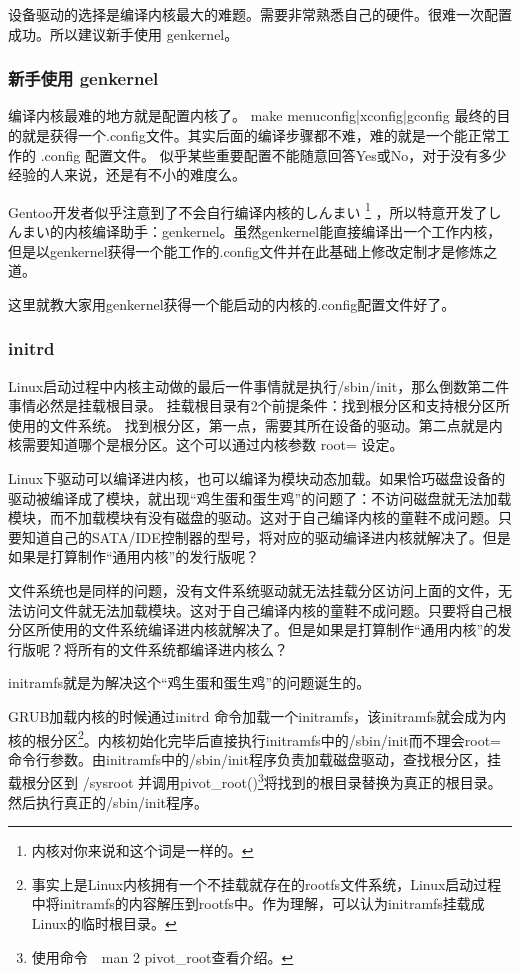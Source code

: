 设备驱动的选择是编译内核最大的难题。需要非常熟悉自己的硬件。很难一次配置成功。所以建议新手使用 genkernel。

\subsubsection{新手使用 genkernel}

编译内核最难的地方就是配置内核了。 make menuconfig|xconfig|gconfig 最终的目的就是获得一个.config文件。其实后面的编译步骤都不难，难的就是一个能正常工作的 .config 配置文件。
似乎某些重要配置不能随意回答Yes或No，对于没有多少经验的人来说，还是有不小的难度么。

Gentoo开发者似乎注意到了不会自行编译内核的しんまい%
\footnote{内核对你来说和这个词是一样的。}%
，所以特意开发了しんまい的内核编译助手：genkernel。虽然genkernel能直接编译出一个工作内核，
但是以genkernel获得一个能工作的.config文件并在此基础上修改定制才是修炼之道。

这里就教大家用genkernel获得一个能启动的内核的.config配置文件好了。

\subsubsection{initrd}\label{sec:initrd}

Linux启动过程中内核主动做的最后一件事情就是执行/sbin/init，那么倒数第二件事情必然是挂载根目录。
挂载根目录有2个前提条件：找到根分区和支持根分区所使用的文件系统。
找到根分区，第一点，需要其所在设备的驱动。第二点就是内核需要知道哪个是根分区。这个可以通过内核参数 root= 设定。

Linux下驱动可以编译进内核，也可以编译为模块动态加载。如果恰巧磁盘设备的驱动被编译成了模块，就出现“鸡生蛋和蛋生鸡”的问题了：不访问磁盘就无法加载模块，而不加载模块有没有磁盘的驱动。这对于自己编译内核的童鞋不成问题。只要知道自己的SATA/IDE控制器的型号，将对应的驱动编译进内核就解决了。但是如果是打算制作“通用内核”的发行版呢？

文件系统也是同样的问题，没有文件系统驱动就无法挂载分区访问上面的文件，无法访问文件就无法加载模块。这对于自己编译内核的童鞋不成问题。只要将自己根分区所使用的文件系统编译进内核就解决了。但是如果是打算制作“通用内核”的发行版呢？将所有的文件系统都编译进内核么？

initramfs就是为解决这个“鸡生蛋和蛋生鸡”的问题诞生的。

GRUB加载内核的时候通过initrd 命令加载一个initramfs，该initramfs就会成为内核的根分区\footnote{事实上是Linux内核拥有一个不挂载就存在的rootfs文件系统，Linux启动过程中将initramfs的内容解压到rootfs中。作为理解，可以认为initramfs挂载成Linux的临时根目录。}。内核初始化完毕后直接执行initramfs中的/sbin/init而不理会root=命令行参数。由initramfs中的/sbin/init程序负责加载磁盘驱动，查找根分区，挂载根分区到 /sysroot 并调用pivot\_root()\footnote{使用命令　man 2 pivot\_root查看介绍。}将找到的根目录替换为真正的根目录。然后执行真正的/sbin/init程序。

